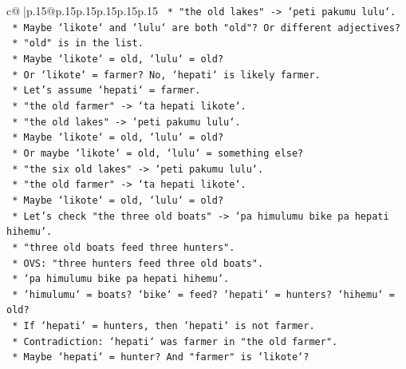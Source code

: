 \documentclass{article}
\begin{document}
{\begin{supertabular}{c@{$\;$}|p{.15\linewidth}@{}p{.15\linewidth}p{.15\linewidth}p{.15\linewidth}p{.15\linewidth}p{.15\linewidth}}
{{{\texttt{                        *   "the old lakes" {-}> `peti pakumu lulu`.} \\
\texttt{                        *   Maybe `likote` and `lulu` are both "old"? Or different adjectives?} \\
\texttt{                        *   "old" is in the list.} \\
\texttt{                        *   Maybe `likote` = old, `lulu` = old?} \\
\texttt{                        *   Or `likote` = farmer? No, `hepati` is likely farmer.} \\
\texttt{                        *   Let's assume `hepati` = farmer.} \\
\texttt{                        *   "the old farmer" {-}> `ta hepati likote`.} \\
\texttt{                        *   "the old lakes" {-}> `peti pakumu lulu`.} \\
\texttt{                        *   Maybe `likote` = old, `lulu` = old?} \\
\texttt{                        *   Or maybe `likote` = old, `lulu` = something else?} \\
\texttt{                        *   "the six old lakes" {-}> `peti pakumu lulu`.} \\
\texttt{                        *   "the old farmer" {-}> `ta hepati likote`.} \\
\texttt{                        *   Maybe `likote` = old, `lulu` = old?} \\
\texttt{                        *   Let's check "the three old boats" {-}> `pa himulumu bike pa hepati hihemu`.} \\
\texttt{                        *   "three old boats feed three hunters".} \\
\texttt{                        *   OVS: "three hunters feed three old boats".} \\
\texttt{                        *   `pa himulumu bike pa hepati hihemu`.} \\
\texttt{                        *   `himulumu` = boats? `bike` = feed? `hepati` = hunters? `hihemu` = old?} \\
\texttt{                        *   If `hepati` = hunters, then `hepati` is not farmer.} \\
\texttt{                        *   Contradiction: `hepati` was farmer in "the old farmer".} \\
\texttt{                        *   Maybe `hepati` = hunter? And "farmer" is `likote`?} \\
}}}
\end{supertabular}}
\end{document}
